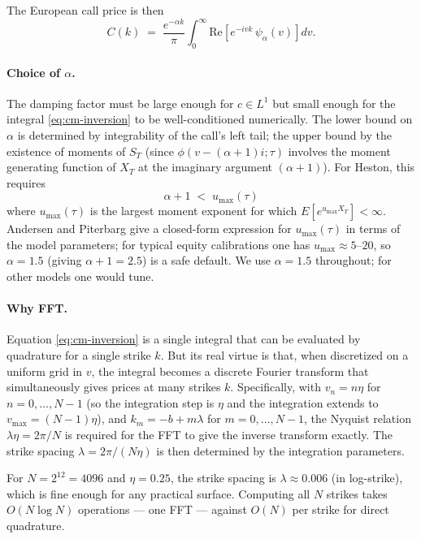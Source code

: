 \documentclass[11pt]{article}
\theoremstyle{plain}
\theoremstyle{definition}
\theoremstyle{remark}
\begin{document}
The European call price is then
\begin{equation}
    C(k) \;=\; \frac{e^{-\alpha k}}{\pi} \int_0^\infty \mathrm{Re}\!\left[e^{-i v k}\, \psi_\alpha(v)\right] dv.                                                  \label{eq:cm-inversion}
\end{equation}

\paragraph{Choice of \(\alpha\).} The damping factor must be large enough for \(c \in L^1\) but small enough for the integral \eqref{eq:cm-inversion} to be well-conditioned numerically. The lower bound on \(\alpha\) is determined by integrability of the call's left tail; the upper bound by the existence of moments of \(S_T\) (since \(\phi(v - (\alpha+1)i; \tau)\) involves the moment generating function of \(X_T\) at the imaginary argument \((\alpha + 1)\)). For Heston, this requires
\[
    \alpha + 1 \;<\; u_{\max}(\tau)
\]
where \(u_{\max}(\tau)\) is the largest moment exponent for which \(E[e^{u_{\max} X_T}] < \infty\). Andersen and Piterbarg \cite{AndersenPiterbarg2007} give a closed-form expression for \(u_{\max}(\tau)\) in terms of the model parameters; for typical equity calibrations one has \(u_{\max} \approx 5\)--\(20\), so \(\alpha = 1.5\) (giving \(\alpha + 1 = 2.5\)) is a safe default. We use \(\alpha = 1.5\) throughout; for other models one would tune.

\paragraph{Why FFT.} Equation \eqref{eq:cm-inversion} is a single integral that can be evaluated by quadrature for a single strike \(k\). But its real virtue is that, when discretized on a uniform grid in \(v\), the integral becomes a discrete Fourier transform that simultaneously gives prices at many strikes \(k\). Specifically, with \(v_n = n \eta\) for \(n = 0, \ldots, N-1\) (so the integration step is \(\eta\) and the integration extends to \(v_{\max} = (N-1)\eta\)), and \(k_m = -b + m \lambda\) for \(m = 0, \ldots, N-1\), the Nyquist relation \(\lambda \eta = 2\pi/N\) is required for the FFT to give the inverse transform exactly. The strike spacing \(\lambda = 2\pi/(N\eta)\) is then determined by the integration parameters.

For \(N = 2^{12} = 4096\) and \(\eta = 0.25\), the strike spacing is \(\lambda \approx 0.006\) (in log-strike), which is fine enough for any practical surface. Computing all \(N\) strikes takes \(O(N \log N)\) operations --- one FFT --- against \(O(N)\) per strike for direct quadrature.
\end{document}
